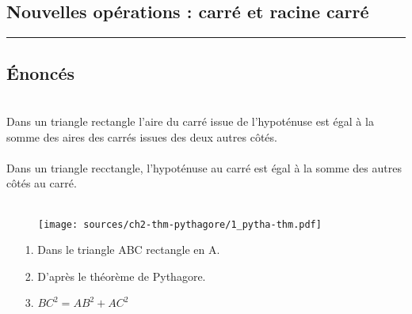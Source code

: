 \documentclass[11pt]{article}
\newcommand{\horrule}[1]{\rule{\linewidth}{#1}} %
\begin{document}
  \subsection{Nouvelles opérations : carré et racine carré}


 
 \horrule{1px}
   
\begin{multicols}{2}

  \subsection{Énoncés}

  \\
  
  Dans un triangle rectangle l'aire du carré issue de l'hypoténuse est égal à la somme des aires des carrés issues des deux autres côtés.\\

  \\
  
  Dans un triangle recctangle, l'hypoténuse au carré est égal à la somme des autres côtés au carré. \\

  \\
  
  \begin{figure}[H]
    \centering
    \texttt{[image: sources/ch2-thm-pythagore/1\_pytha-thm.pdf]}
  \end{figure}
  
  \begin{enumerate}
  \item[1.] Dans le triangle ABC rectangle en A.
  \item[2.] D'après le théorème de Pythagore.
  \item[3.] $BC^2 = AB^2 + AC^2$
  \end{enumerate}


\end{multicols}
\end{document}
